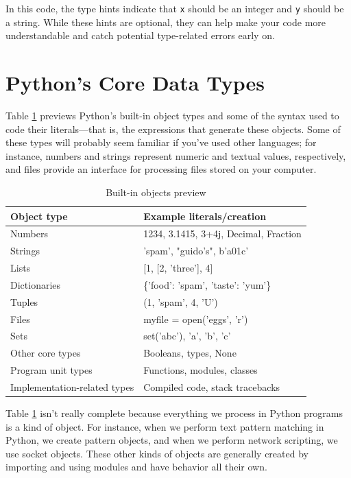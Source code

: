 \documentclass[12pt]{book}
\begin{document}
In this code, the type hints indicate that \texttt{x} should be an integer and \texttt{y} should be a string. While these hints are optional, they can help make your code more understandable and catch potential type-related errors early on.

\section{Python's Core Data Types}

Table \ref{tab:builtin-objects} previews Python's built-in object types and some of the syntax used to code their literals—that is, the expressions that generate these objects. Some of these types will probably seem familiar if you've used other languages; for instance, numbers and strings represent numeric and textual values, respectively, and files provide an interface for processing files stored on your computer.

\begin{table}[htbp]
    \centering
    \caption{Built-in objects preview}
    \label{tab:builtin-objects}
    \begin{tabular}{|l|l|}
    \hline
    \textbf{Object type} & \textbf{Example literals/creation} \\
    \hline
    Numbers & 1234, 3.1415, 3+4j, Decimal, Fraction \\
    Strings & 'spam', "guido's", b'a\x01c' \\
    Lists & [1, [2, 'three'], 4] \\
    Dictionaries & \{'food': 'spam', 'taste': 'yum'\} \\
    Tuples & (1, 'spam', 4, 'U') \\
    Files & myfile = open('eggs', 'r') \\
    Sets & set('abc'), {'a', 'b', 'c'} \\
    Other core types & Booleans, types, None \\
    Program unit types & Functions, modules, classes \\
    Implementation-related types & Compiled code, stack tracebacks \\
    \hline
    \end{tabular}
\end{table}

Table \ref{tab:builtin-objects} isn't really complete because everything we process in Python programs is a kind of object. For instance, when we perform text pattern matching in Python, we create pattern objects, and when we perform network scripting, we use socket objects. These other kinds of objects are generally created by importing and using modules and have behavior all their own.
\end{document}
